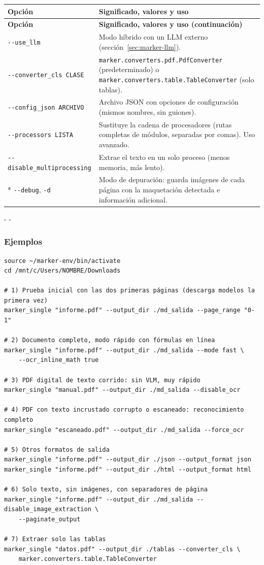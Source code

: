 \documentclass[11pt,a4paper]{article}
\makeatletter
\newcommand{\necesitaespacio}[1]{\par\penalty-100\begingroup
	\setlength{\dimen@}{#1}\dimen@ii\pagegoal\advance\dimen@ii-\pagetotal
	\ifdim\dimen@>\dimen@ii\ifdim\dimen@ii>\z@\vfil\fi\penalty-\@M\fi\endgroup}
\newenvironment{opciones}[1][Opción]{%
	\par\begingroup\small
	\begin{longtable}{L{4.25cm}L{11.2cm}}
		\toprule\rowcolor{tablacab}\cab{#1} & \cab{Significado, valores y uso} \\ \midrule
		\endfirsthead
		\toprule\rowcolor{tablacab}\cab{#1} & \cab{Significado, valores y uso (continuación)} \\ \midrule
		\endhead
		\bottomrule
		\endfoot}
	{\end{longtable}\endgroup}
\newcommand{\opt}[1]{\texttt{\textcolor{colopt}{#1}}}      %
\newcommand{\val}[1]{\texttt{#1}}                          %
\newcommand{\cab}[1]{\textbf{#1}}
\makeatother
\begin{document}
\begin{opciones}
		\opt{-{}-use\_llm} & Modo híbrido con un LLM externo (sección~\ref{sec:marker-llm}).\\
		\opt{-{}-converter\_\allowbreak{}cls CLASE} & \val{marker.converters.pdf.PdfConverter} (predeterminado) o \val{marker.converters.table.TableConverter} (solo tablas).\\
		\opt{-{}-config\_\allowbreak{}json ARCHIVO} & Archivo JSON con opciones de configuración (mismos nombres, sin guiones).\\
		\opt{-{}-processors LISTA} & Sustituye la cadena de procesadores (rutas completas de módulos, separadas por comas). Uso avanzado.\\
		\opt{-{}-disable\_\allowbreak{}multiprocessing} & Extrae el texto en un solo proceso (menos memoria, más lento).\\*
		\opt{-{}-debug}, \opt{-d} & Modo de depuración: guarda imágenes de cada página con la maquetación detectada e información adicional.\\
	\end{opciones}
	
	\necesitaespacio{6\baselineskip}
	\subsubsection{Ejemplos}
	
	\begin{lstlisting}
source ~/marker-env/bin/activate
cd /mnt/c/Users/NOMBRE/Downloads

# 1) Prueba inicial con las dos primeras páginas (descarga modelos la primera vez)
marker_single "informe.pdf" --output_dir ./md_salida --page_range "0-1"

# 2) Documento completo, modo rápido con fórmulas en línea
marker_single "informe.pdf" --output_dir ./md_salida --mode fast \
    --ocr_inline_math true

# 3) PDF digital de texto corrido: sin VLM, muy rápido
marker_single "manual.pdf" --output_dir ./md_salida --disable_ocr

# 4) PDF con texto incrustado corrupto o escaneado: reconocimiento completo
marker_single "escaneado.pdf" --output_dir ./md_salida --force_ocr

# 5) Otros formatos de salida
marker_single "informe.pdf" --output_dir ./json --output_format json
marker_single "informe.pdf" --output_dir ./html --output_format html

# 6) Solo texto, sin imágenes, con separadores de página
marker_single "informe.pdf" --output_dir ./md_salida --disable_image_extraction \
    --paginate_output

# 7) Extraer solo las tablas
marker_single "datos.pdf" --output_dir ./tablas --converter_cls \
    marker.converters.table.TableConverter
\end{lstlisting}
	
\end{document}
